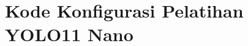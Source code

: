 \section*{Kode Konfigurasi Pelatihan YOLO11 Nano}
{\renewcommand{\YAMLkeystyle}{\color{black}\ttfamily\fontsize{10}{5.5}\selectfont}%
\renewcommand{\YAMLvaluestyle}{\color{codepurple}\ttfamily\fontsize{10}{5.5}\selectfont}%
\renewcommand{\YAMLcolonstyle}{\color{magenta}\mdseries}%
}




